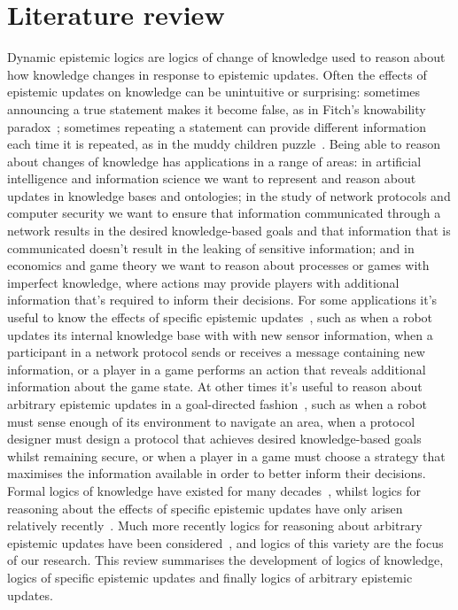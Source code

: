 \chapter{Literature review}\label{literature}

Dynamic epistemic logics are logics of change of knowledge used to reason about how knowledge changes in response to epistemic updates.
Often the effects of epistemic updates on knowledge can be unintuitive or surprising: sometimes announcing a true statement makes it become false, as in Fitch's knowability paradox~\cite{fitch:1963}; sometimes repeating a statement can provide different information each time it is repeated, as in the muddy children puzzle~\cite{barwise:1981, vanditmarsch:2007}. 
Being able to reason about changes of knowledge has applications in a range of areas:
in artificial intelligence and information science we want to represent and reason about updates in knowledge bases and ontologies;
in the study of network protocols and computer security we want to ensure that information communicated through a network results in the desired knowledge-based goals
 and that information that is communicated doesn't result in the leaking of sensitive information; and
in economics and game theory we want to reason about processes or games with imperfect knowledge, where actions may provide players with additional information that's required to inform their decisions.
For some applications it's useful to know the effects of specific epistemic updates~\cite{plaza:1989,baltag:1998}, such as when a robot updates its internal knowledge base with with new sensor information, when a participant in a network protocol sends or receives a message containing new information, or a player in a game performs an action that reveals additional information about the game state.
At other times it's useful to reason about arbitrary epistemic updates in a goal-directed fashion~\cite{balbiani:2007,agotnes:2010,vanditmarsch:2009}, such as when a robot must sense enough of its environment to navigate an area, when a protocol designer must design a protocol that achieves desired knowledge-based goals whilst remaining secure, or when a player in a game must choose a strategy that maximises the information available in order to better inform their decisions.
Formal logics of knowledge have existed for many decades~\cite{vonwright:1951,hintikka:1957,hintikka:1961,hintikka:1962}, whilst logics for reasoning about the effects of specific epistemic updates have only arisen relatively recently~\cite{plaza:1989,gerbrandy:1997,baltag:1998}. 
Much more recently logics for reasoning about arbitrary epistemic updates have been considered~\cite{balbiani:2007,vanditmarsch:2009,agotnes:2010}, and logics of this variety are the focus of our research.
This review summarises the development of logics of knowledge, logics of specific epistemic updates and finally logics of arbitrary epistemic updates.  


